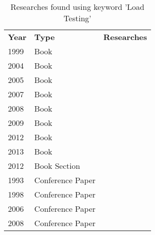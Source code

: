 \begin{table}[]
\centering
\caption{Researches found using keyword 'Load Testing'}
\label{my-label}
\begin{tabular}{lll}
\rowcolor[HTML]{9B9B9B} 
\textbf{Year} & \textbf{Type}    & \textbf{Researches}                                                                 \\
1999          & Book             & \cite{Dustin1999}                                                                   \\
2004          & Book             & \cite{Perry2004}                                                                    \\
2005          & Book             & \cite{Lewis2005}                                                                    \\
2007          & Book             & \cite{Corporation2007}                                                              \\
2008          & Book             & \cite{Halili2008}                                                                   \\
2009          & Book             & \cite{Molyneaux2009}                                                                \\
2012          & Book             & \cite{Kaczanowski2012}                                                              \\
2013          & Book             & \cite{Erinle2013}                                                                   \\
2012          & Book Section     & \cite{Avritzer2012a}                                                                \\
1993          & Conference Paper & \cite{Avritzer1993d}                                                                \\
1998          & Conference Paper & \cite{Alander}                                                                      \\
2006          & Conference Paper & \cite{Draheim2006b}\cite{Abu-nimeh2001}                                             \\
2008          & Conference Paper & \cite{Jiang2008b}                                                                   \\

\end{tabular}
\end{table}
